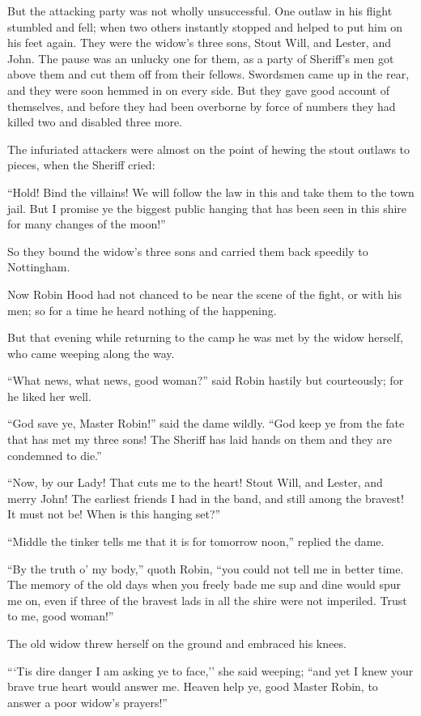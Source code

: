 But the attacking party was not wholly unsuccessful. One outlaw in his
flight stumbled and fell; when two others instantly stopped and helped
to put him on his feet again. They were the widow's three sons, Stout
Will, and Lester, and John. The pause was an unlucky one for them, as a
party of Sheriff's men got above them and cut them off from their
fellows. Swordsmen came up in the rear, and they were soon hemmed in on
every side. But they gave good account of themselves, and before they
had been overborne by force of numbers they had killed two and disabled
three more.

The infuriated attackers were almost on the point of hewing the stout
outlaws to pieces, when the Sheriff cried:

``Hold! Bind the villains! We will follow the law in this and take them
to the town jail. But I promise ye the biggest public hanging that has
been seen in this shire for many changes of the moon!''

So they bound the widow's three sons and carried them back speedily to
Nottingham.

Now Robin Hood had not chanced to be near the scene of the fight, or
with his men; so for a time he heard nothing of the happening.

But that evening while returning to the camp he was met by the widow
herself, who came weeping along the way.

``What news, what news, good woman?'' said Robin hastily but
courteously; for he liked her well.

``God save ye, Master Robin!'' said the dame wildly. ``God keep ye from
the fate that has met my three sons! The Sheriff has laid hands on them
and they are condemned to die.''

``Now, by our Lady! That cuts me to the heart! Stout Will, and Lester,
and merry John! The earliest friends I had in the band, and still among
the bravest! It must not be! When is this hanging set?''

``Middle the tinker tells me that it is for tomorrow noon,'' replied the
dame.

``By the truth o' my body,'' quoth Robin, ``you could not tell me in
better time. The memory of the old days when you freely bade me sup and
dine would spur me on, even if three of the bravest lads in all the
shire were not imperiled. Trust to me, good woman!''

The old widow threw herself on the ground and embraced his knees.

```Tis dire danger I am asking ye to face,'' she said weeping; ``and yet
I knew your brave true heart would answer me. Heaven help ye, good
Master Robin, to answer a poor widow's prayers!''

